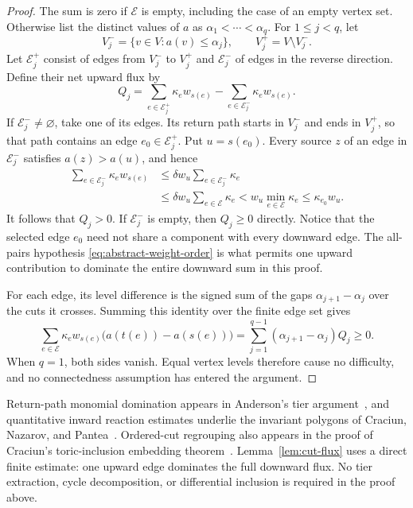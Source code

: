 \begin{proof}
The sum is zero if $\mathcal E$ is empty, including the case of an empty
vertex set. Otherwise list the distinct values of $a$ as
$\alpha_1<\cdots<\alpha_q$. For $1\le j<q$, let
\[
 V_j^- =\{v\in V:a(v)\le\alpha_j\},
 \qquad V_j^+=V\setminus V_j^-.
\]
Let $\mathcal E_j^+$ consist of edges from $V_j^-$ to $V_j^+$ and
$\mathcal E_j^-$ of edges in the reverse direction. Define their net
upward flux by
\[
 Q_j=\sum_{e\in\mathcal E_j^+}\kappa_e w_{s(e)}
      -\sum_{e\in\mathcal E_j^-}\kappa_e w_{s(e)}.
\]
If $\mathcal E_j^-\ne\varnothing$, take one of its edges. Its return
path starts in $V_j^-$ and ends in $V_j^+$, so that path contains an edge
$e_0\in\mathcal E_j^+$. Put $u=s(e_0)$. Every source $z$ of an edge
in $\mathcal E_j^-$ satisfies $a(z)>a(u)$, and hence
\begin{align*}
 \sum_{e\in\mathcal E_j^-}\kappa_e w_{s(e)}
 &\le \delta w_u\sum_{e\in\mathcal E_j^-}\kappa_e\\
 &\le \delta w_u\sum_{e\in\mathcal E}\kappa_e
 <w_u\min_{e\in\mathcal E}\kappa_e
 \le \kappa_{e_0}w_u.
\end{align*}
It follows that $Q_j>0$. If $\mathcal E_j^-$ is empty, then $Q_j\ge0$
directly.
Notice that the selected edge $e_0$ need not share a component with every
downward edge. The all-pairs hypothesis
\eqref{eq:abstract-weight-order} is what permits one upward contribution
to dominate the entire downward sum in this proof.

For each edge, its level difference is the signed sum of the gaps
$\alpha_{j+1}-\alpha_j$ over the cuts it crosses. Summing this identity
over the finite edge set gives
\begin{equation}\label{eq:cut-decomposition}
 \sum_{e\in\mathcal E}
 \kappa_e w_{s(e)}\bigl(a(t(e))-a(s(e))\bigr)
 =\sum_{j=1}^{q-1}(\alpha_{j+1}-\alpha_j)Q_j\ge0.
\end{equation}
When $q=1$, both sides vanish. Equal vertex levels therefore cause no
difficulty, and no connectedness assumption has entered the argument.
\end{proof}

Return-path monomial domination appears in Anderson's tier
argument~\cite[Lemma~4.7]{Anderson2011Global}, and quantitative inward
reaction estimates underlie the invariant polygons of Craciun, Nazarov,
and Pantea~\cite{CraciunNazarovPantea2013}. Ordered-cut regrouping also
appears in the proof of Craciun's toric-inclusion embedding
theorem~\cite[preprint, Theorem~4.1]{Craciun2019}. Lemma~\ref{lem:cut-flux}
uses a direct finite estimate: one upward edge dominates the full downward
flux. No tier extraction, cycle decomposition, or differential inclusion
is required in the proof above.

